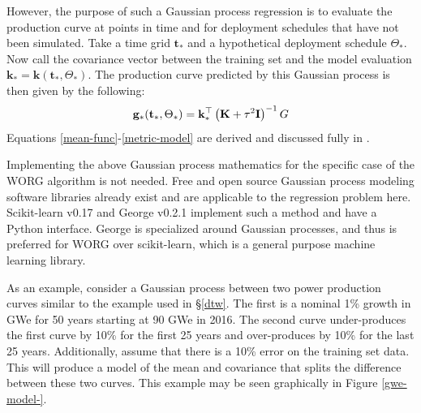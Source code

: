 However, the purpose of such a Gaussian process regression is to evaluate 
the production curve at points in time and for deployment schedules that 
have not been simulated. Take a time grid $\mathbf{t_*}$ and a hypothetical
deployment schedule $\Theta_*$. Now call the covariance vector between
the training set and the model evaluation    
$\mathbf{k}_* = \mathbf{k}(\mathbf{t_*}, \Theta_*)$. 
The production curve predicted by this Gaussian process is then given by
the following:
\begin{equation}
\label{metric-model}
\mathbf{g}_*(\mathbf{t}_*, \Theta_*) = 
    \mathbf{k}_*^\top \left(\mathbf{K} + \tau^2\mathbf{I}\right)^{-1}G
\end{equation}
Equations \ref{mean-func}-\ref{metric-model} are derived and discussed fully
in \cite{rasmussen2006gaussian}. 

Implementing the above Gaussian process mathematics for the specific
case of the WORG algorithm 
is not needed.  Free and open source Gaussian process modeling software 
libraries already exist and are applicable to the regression problem here.
Scikit-learn v0.17 \cite{scikit-learn} and George v0.2.1 \cite{hodlr} 
implement such a method and have a Python interface. George is specialized 
around Gaussian processes, and thus is preferred for WORG over scikit-learn, 
which is a general purpose machine learning library.

As an example, consider a Gaussian process between two power production 
curves similar to the example used in \S\ref{dtw}. The first is a nominal 1\% growth 
in GWe for 50 years starting at 
90 GWe in 2016. The second curve under-produces the first curve by 10\% 
for the first 25 years and over-produces by 10\% for the last 25 years.
Additionally, assume that there is a 10\% error on the training set data.
This will produce a model of the mean and covariance that splits the 
difference between these two curves. This example may be seen graphically
in Figure \ref{gwe-model-}.

